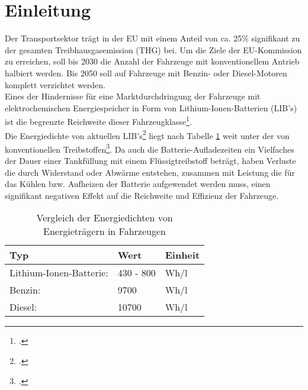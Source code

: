\section{Einleitung}\label{sec:Einleitung}
%

Der Transportsektor trägt in der EU mit einem Anteil von ca. 25\% signifikant zu der gesamten Treibhausgasemission (THG) bei. Um die Ziele der EU-Kommission zu erreichen, soll bis 2030 die Anzahl der Fahrzeuge mit konventionellem Antrieb halbiert werden. Bis 2050 soll auf Fahrzeuge mit Benzin- oder Diesel-Motoren komplett verzichtet werden.\\
Eines der Hindernisse für eine Marktdurchdringung der Fahrzeuge mit elektrochemischen Energiespeicher in Form von Lithium-Ionen-Batterien (LIB's) ist die begrenzte Reichweite dieser Fahrzeugklasse\footcite[Vgl.][S.136-146]{Ajanovic2020}.\\
Die Energiedichte von aktuellen LIB's\footcite[Vgl.][S. 11]{Hettesheimer2017} liegt nach Tabelle \ref{tab:Energiedichten} weit unter der von konventionellen Treibstoffen\footcite[Vgl.][]{BeloitEDU2021}. Da auch die Batterie-Aufladezeiten ein Vielfaches der Dauer einer Tankfüllung mit einem Flüssigtreibstoff beträgt, haben Verluste die durch Widerstand oder Abwärme entstehen, zusammen mit Leistung die für das Kühlen bzw. Aufheizen der Batterie aufgewendet werden muss, einen signifikant negativen Effekt auf die Reichweite und Effizienz der Fahrzeuge.\\

\begin{table}[H]
	\caption{Vergleich der Energiedichten von Energieträgern in Fahrzeugen}
	\label{tab:Energiedichten}
	\vspace{0.2cm}	
	\begin{tabularx}{\textwidth}{ |X|X|X|  }
		\toprule[1.5pt]
		\textbf{Typ} & \textbf{Wert} & \textbf{Einheit} \\
		\hline\hline
		Lithium-Ionen-Batterie: & 430 - 800 & Wh/l \\
		\hline
		Benzin: & 9700 & Wh/l \\
		\hline
		Diesel: & 10700 & Wh/l \\
		\bottomrule[1.5pt]
	\end{tabularx}		
\end{table}

















